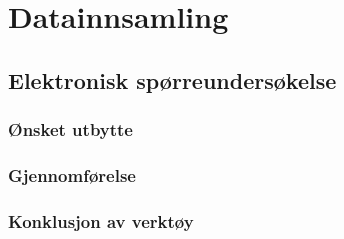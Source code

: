 \chapter{Datainnsamling}

\section{Elektronisk spørreundersøkelse}

\subsection{Ønsket utbytte}

\subsection{Gjennomførelse}

\subsection{Konklusjon av verktøy}